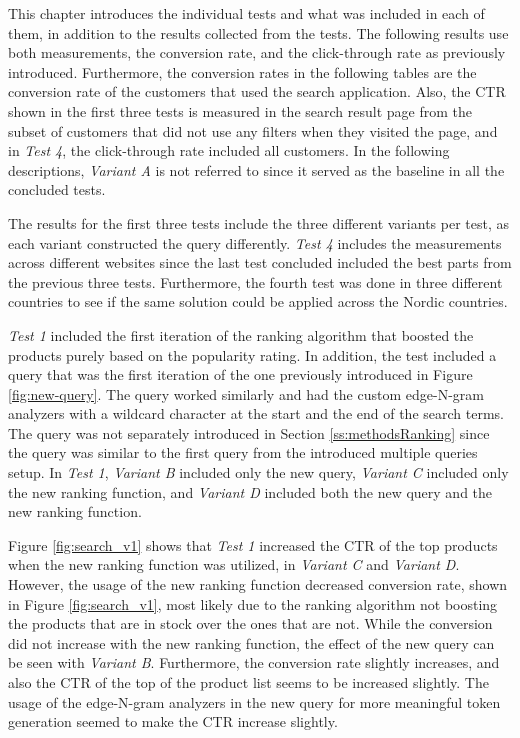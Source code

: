 

This chapter introduces the individual tests and what was included in each of them, in addition to 
the results collected from the tests.
The following results use both measurements, the conversion rate, and the click-through rate as previously introduced.
Furthermore, the conversion rates in the following tables are the conversion rate of the customers
that used the search application.
Also, the CTR shown in the first three tests is measured in the search result page from the subset of customers
that did not use any filters when they visited the page, and in \emph{Test 4}, the click-through rate included all
customers.
In the following descriptions, \emph{Variant A} is not referred to 
since it served as the baseline in all the concluded tests.


The results for the first three tests include the three different variants per test,
as each variant constructed the query differently.
\emph{Test 4} includes the measurements across different websites since the last test concluded included
the best parts from the previous three tests.
Furthermore, the fourth test was done in three different countries to see if the same solution could be applied
across the Nordic countries.


\emph{Test 1} included the first iteration of the ranking algorithm that boosted the products purely based
on the popularity rating.
In addition, the test included a query that was the first iteration of the one previously introduced in Figure \ref{fig:new-query}.
The query worked similarly and had the custom edge-N-gram analyzers with a wildcard character at the start and the end
of the search terms.
The query was not separately introduced in Section \ref{ss:methodsRanking} since the query was similar to the first query
from the introduced multiple queries setup.
In \emph{Test 1}, \emph{Variant B} included only the new query, \emph{Variant C} included only the new ranking function,
and \emph{Variant D} included both the new query and the new ranking function.

Figure \ref{fig:search_v1} shows that \emph{Test 1} increased the CTR of the top products when the new ranking function 
was utilized, in \emph{Variant C} and \emph{Variant D}.
However, the usage of the new ranking function decreased conversion rate, shown in Figure \ref{fig:search_v1}, most likely
due to the ranking algorithm not boosting the products that are in stock over the ones that are not.
While the conversion did not increase with the new ranking function, the effect of the new query can be seen with \emph{Variant B}.
Furthermore, the conversion rate slightly increases, and also the CTR of the top of the product list seems to be increased slightly.
The usage of the edge-N-gram analyzers in the new query for more meaningful token generation seemed to make the CTR increase
slightly. 


